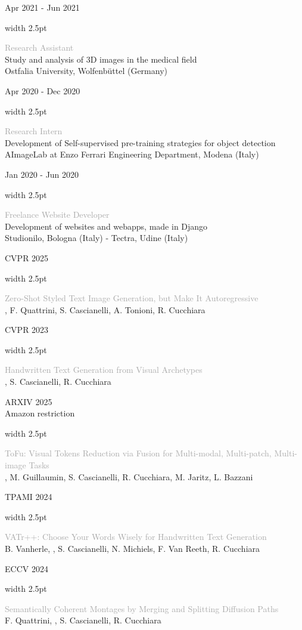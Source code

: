 \documentclass[10pt,a4paper]{article}
\newcommand{\cvsection}[1]{
    \vspace{2.2ex}
    \noindent{\Large \textcolor{darkgray}{#1}}
    \vspace{0.8ex}\par
}
\newcommand{\cventry}[3]{
    \par\noindent
    \begin{minipage}[t]{0.19\textwidth}
        \raggedleft \footnotesize \textcolor{textgray}{#2}
    \end{minipage}%
    \hspace{0.015\textwidth}%
    \textcolor{#1}{\vrule width 2.5pt}%
    \hspace{0.015\textwidth}%
    \begin{minipage}[t]{0.75\textwidth}
        \footnotesize #3
    \end{minipage}
    \par\vspace{0.6ex}
}
\begin{document}
\cventry{we3}{Apr 2021 - Jun 2021}{\textcolor{darkgray}{Research Assistant} \\ \textcolor{textgray}{Study and analysis of 3D images in the medical field \\ Ostfalia University, Wolfenbüttel (Germany)}}

\cventry{we4}{Apr 2020 - Dec 2020}{\textcolor{darkgray}{Research Intern} \\ \textcolor{textgray}{Development of Self-supervised pre-training strategies for object detection \\ AImageLab at Enzo Ferrari Engineering Department, Modena (Italy)}}

\cventry{we5}{Jan 2020 - Jun 2020}{\textcolor{darkgray}{Freelance Website Developer} \\ \textcolor{textgray}{Development of websites and webapps, made in Django \\ Studionilo, Bologna (Italy) - Tectra, Udine (Italy)}}

\cvsection{Selected Publications}

\cventry{pub1}{CVPR 2025}{\textcolor{darkgray}{Zero-Shot Styled Text Image Generation, but Make It Autoregressive} \\ \textcolor{textgray}{, F. Quattrini, S. Cascianelli, A. Tonioni, R. Cucchiara}}

\cventry{pub1}{CVPR 2023}{\textcolor{darkgray}{Handwritten Text Generation from Visual Archetypes} \\ \textcolor{textgray}{, S. Cascianelli, R. Cucchiara}}

\cventry{pub1}{ARXIV 2025 \\ \textcolor{pubpink}{Amazon restriction}}{\textcolor{darkgray}{ToFu: Visual Tokens Reduction via Fusion for Multi-modal, Multi-patch, Multi-image Tasks} \\ \textcolor{textgray}{\hlbox{V. Pippi}, M. Guillaumin, S. Cascianelli, R. Cucchiara, M. Jaritz, L. Bazzani}}

\cventry{pub1}{TPAMI 2024}{\textcolor{darkgray}{VATr++: Choose Your Words Wisely for Handwritten Text Generation} \\ \textcolor{textgray}{B. Vanherle, , S. Cascianelli, N. Michiels, F. Van Reeth, R. Cucchiara}}

\cventry{pub1}{ECCV 2024}{\textcolor{darkgray}{Semantically Coherent Montages by Merging and Splitting Diffusion Paths} \\ \textcolor{textgray}{F. Quattrini, \hlbox{V. Pippi}, S. Cascianelli, R. Cucchiara}}
\end{document}
